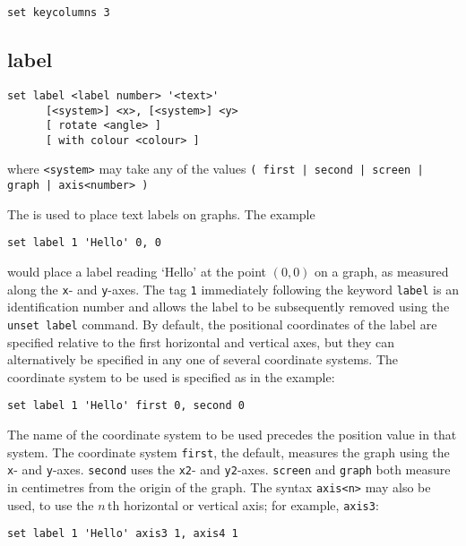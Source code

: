 \begin{verbatim}
set keycolumns 3
\end{verbatim}


\subsection{label}

\begin{verbatim}
set label <label number> '<text>'
      [<system>] <x>, [<system>] <y>
      [ rotate <angle> ]
      [ with colour <colour> ]
\end{verbatim}

\noindent where {\tt <system>} may take any of the values
\newline\noindent
{\tt ( first | second | screen | graph | axis<number> )}
\vspace{5mm}

The  is used to place text labels on graphs. The example

\begin{verbatim}
set label 1 'Hello' 0, 0
\end{verbatim}

\noindent would place a label reading `Hello' at the point $(0,0)$ on a graph,
as measured along the {\tt x}- and {\tt y}-axes.  The tag {\tt 1} immediately
following the keyword {\tt label} is an identification number and allows the
label to be subsequently removed using the {\tt unset label} command. By
default, the positional coordinates of the label are specified relative to the
first horizontal and vertical axes, but they can alternatively be specified in
any one of several coordinate systems. The coordinate system to be used is
specified as in the example:

\begin{verbatim}
set label 1 'Hello' first 0, second 0
\end{verbatim}

\noindent The name of the coordinate system to be used precedes the position
value in that system. The coordinate system {\tt first}, the default, measures
the graph using the {\tt x}- and {\tt y}-axes. {\tt second} uses the {\tt x2}-
and {\tt y2}-axes.  {\tt screen} and {\tt graph} both measure in centimetres
from the origin of the graph.  The syntax {\tt axis<n>} may also be used, to
use the $n\,$th horizontal or vertical axis; for example, {\tt axis3}:

\begin{verbatim}
set label 1 'Hello' axis3 1, axis4 1
\end{verbatim}

